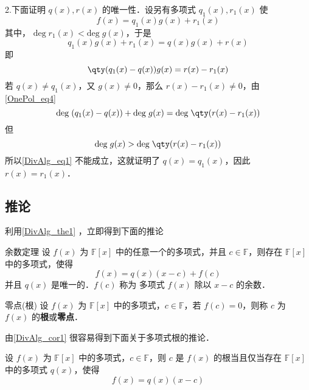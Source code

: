 2.下面证明 $q(x),r(x)$ 的唯一性．设另有多项式 $q_1(x),r_1(x)$ 使
\begin{equation}
f(x)=q_1(x)g(x)+r_1(x)
\end{equation}
其中， $\mathrm{deg}\;r_1(x)<\mathrm{deg}\;g(x)$，于是
\begin{equation}
q_1(x)g(x)+r_1(x)=q(x)g(x)+r(x)
\end{equation}
即
\begin{equation}
\qty(q_1(x)-q(x))g(x)=r(x)-r_1(x)
\end{equation}
若 $q(x)\neq q_1(x)$，又 $g(x)\neq 0$，那么 $r(x)-r_1(x)\neq 0$，由\autoref{OnePol_eq4}~
\begin{equation}\label{DivAlg_eq1}
\mathrm{deg}\;(q_1(x)-q(x))+\mathrm{deg}\;g(x)=\mathrm{deg}\;\qty(r(x)-r_1(x))
\end{equation}
但
\begin{equation}
\mathrm{deg}\;g(x)>\mathrm{deg}\;\qty(r(x)-r_1(x))
\end{equation}
所以\autoref{DivAlg_eq1} 不能成立，这就证明了
$q(x)=q_1(x)$，因此 $r(x)=r_1(x)$．
\subsection{推论}
利用\autoref{DivAlg_the1} ，立即得到下面的推论
\begin{corollary}{余数定理}\label{DivAlg_cor1}
设 $f(x)$ 为 $\mathbb{F}[x]$ 中的任意一个的多项式，并且 $c\in\mathbb{F}$，则存在 $\mathbb{F}[x]$ 中的多项式，使得
\begin{equation}
f(x)=q(x)(x-c)+f(c)
\end{equation}
并且 $q(x)$ 是唯一的．$f(c)$ 称为 多项式 $f(x)$ 除以 $x-c$ 的余数．
\end{corollary}
\begin{definition}{零点(根)}
设 $f(x)$ 为 $\mathbb{F}[x]$ 中的多项式，$c\in\mathbb{F}$，若 $f(c)=0$，则称 $c$ 为 $f(x)$ 的\textbf{根}或\textbf{零点}．
\end{definition}
由\autoref{DivAlg_cor1} 很容易得到下面关于多项式根的推论．
\begin{corollary}{}\label{DivAlg_cor2}
设 $f(x)$ 为 $\mathbb{F}[x]$ 中的多项式，$c\in\mathbb{F}$，则 $c$ 是 $f(x)$ 的根当且仅当存在 $\mathbb{F}[x]$ 中的多项式 $q(x)$，使得
\begin{equation}
f(x)=q(x)(x-c)
\end{equation}

\end{corollary}